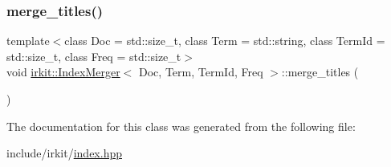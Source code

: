 \subsubsection{\texorpdfstring{merge\+\_\+titles()}{merge\_titles()}}
{\footnotesize\ttfamily template$<$class Doc  = std\+::size\+\_\+t, class Term  = std\+::string, class Term\+Id  = std\+::size\+\_\+t, class Freq  = std\+::size\+\_\+t$>$ \\
void \hyperlink{classirkit_1_1IndexMerger}{irkit\+::\+Index\+Merger}$<$ Doc, Term, Term\+Id, Freq $>$\+::merge\+\_\+titles (\begin{DoxyParamCaption}{ }\end{DoxyParamCaption})\hspace{0.3cm}{\ttfamily [inline]}}



The documentation for this class was generated from the following file\+:\begin{DoxyCompactItemize}
\item 
include/irkit/\hyperlink{irkit_2index_8hpp}{index.\+hpp}\end{DoxyCompactItemize}
